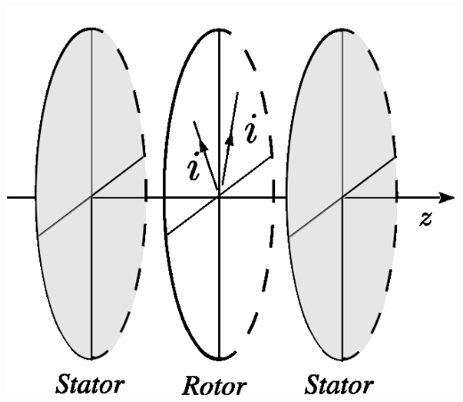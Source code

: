 \documentclass[../../main/main.tex]{subfiles}
\begin{document}
\begin{minipage}[t]{.30\linewidth}
	~
	\begin{center}
		\includegraphics[scale=1]{mot_entrefer-olivier}
		\label{fig:motolivier}
	\end{center}
\end{minipage}
\hfill~
\smallbreak
\end{document}
